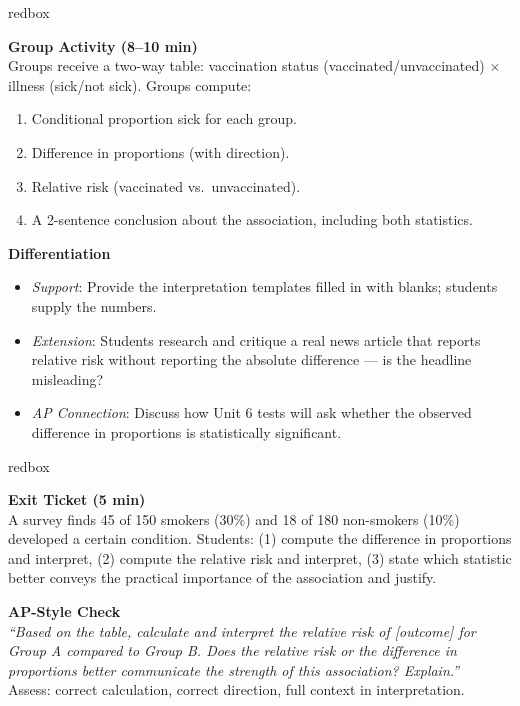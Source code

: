 \documentclass[10pt]{article}
\begin{document}
\begin{skillbox}{redbox}
\begin{minipage}[t]{0.48\linewidth}
    \textbf{Group Activity (8--10 min)}\\
    Groups receive a two-way table: vaccination status (vaccinated/unvaccinated) $\times$ illness (sick/not sick). Groups compute:
    \begin{enumerate}
        \item Conditional proportion sick for each group.
        \item Difference in proportions (with direction).
        \item Relative risk (vaccinated vs.\ unvaccinated).
        \item A 2-sentence conclusion about the association, including both statistics.
    \end{enumerate}
\end{minipage}
\hfill
\begin{minipage}[t]{0.48\linewidth}
    \textbf{Differentiation}
    \begin{itemize}
        \item \textit{Support}: Provide the interpretation templates filled in with blanks; students supply the numbers.
        \item \textit{Extension}: Students research and critique a real news article that reports relative risk without reporting the absolute difference --- is the headline misleading?
        \item \textit{AP Connection}: Discuss how Unit 6 tests will ask whether the observed difference in proportions is statistically significant.
    \end{itemize}
\end{minipage}
\end{skillbox}

\begin{skillbox}{redbox}
\begin{minipage}[t]{0.48\linewidth}
    \textbf{Exit Ticket (5 min)}\\
    A survey finds 45 of 150 smokers (30\%) and 18 of 180 non-smokers (10\%) developed a certain condition. Students: (1) compute the difference in proportions and interpret, (2) compute the relative risk and interpret, (3) state which statistic better conveys the practical importance of the association and justify.
\end{minipage}
\hfill
\begin{minipage}[t]{0.48\linewidth}
    \textbf{AP-Style Check}\\
    \textit{``Based on the table, calculate and interpret the relative risk of [outcome] for Group A compared to Group B. Does the relative risk or the difference in proportions better communicate the strength of this association? Explain.''}\\[4pt]
    Assess: correct calculation, correct direction, full context in interpretation.
\end{minipage}
\end{skillbox}
\end{document}
